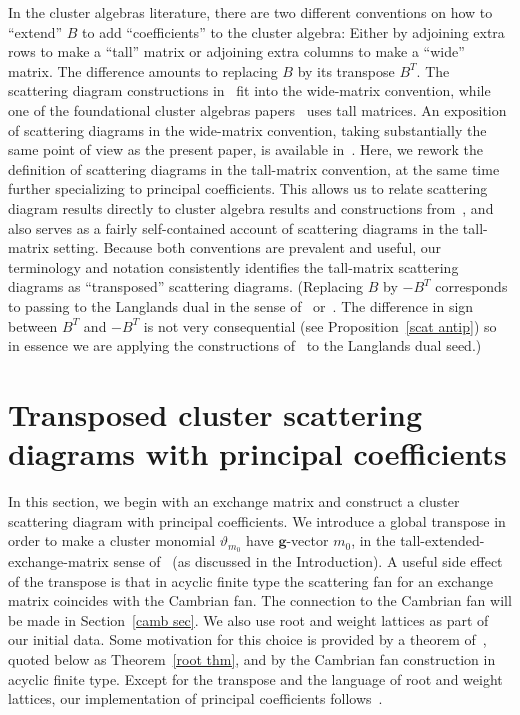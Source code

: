 \documentclass[ALCO,ThmDefs,Unicode,epreuves]{cedram}
\newcommand{\thet}{\vartheta}
\newcommand{\g}{\mathbf{g}}
\begin{document}
In the cluster algebras literature, there are two different conventions on how to ``extend'' $B$ to add ``coefficients'' to the cluster algebra: Either by adjoining extra rows to make a ``tall'' matrix or adjoining extra columns to make a ``wide'' matrix.
The difference amounts to replacing $B$ by its transpose $B^T$.
The scattering diagram constructions in~\cite{GHKK} fit into the wide-matrix convention, while one of the foundational cluster algebras papers~\cite{ca4} uses tall matrices.
An exposition of scattering diagrams in the wide-matrix convention, taking substantially the same point of view as the present paper, is available in~\cite{scatfan}.
Here, we rework the definition of scattering diagrams in the tall-matrix convention, at the same time further specializing to principal coefficients.
This allows us to relate scattering diagram results directly to cluster algebra results and constructions from~\cite{ca4}, and also serves as a fairly self-contained account of scattering diagrams in the tall-matrix setting.
Because both conventions are prevalent and useful, our terminology and notation consistently identifies the tall-matrix scattering diagrams as ``transposed'' scattering diagrams.
(Replacing $B$ by $-B^T$ corresponds to passing to the Langlands dual in the sense of~\cite[Section~1.2]{FG} or~\cite[Appendix~A]{GHKK}.
The difference in sign between $B^T$ and $-B^T$ is not very consequential (see Proposition~\ref{scat antip}) so in essence we are applying the constructions of~\cite{GHKK} to the Langlands dual seed.)





\section{Transposed cluster scattering diagrams with principal coefficients}\label{transp sec}
In this section, we begin with an exchange matrix and construct a cluster scattering diagram with principal coefficients.
We introduce a global transpose in order to make a cluster monomial $\thet_{m_0}$ have $\g$-vector $m_0$, in the tall-extended-exchange-matrix sense of~\cite{ca4} (as discussed in the Introduction).
A useful side effect of the transpose is that in acyclic finite type the scattering fan for an exchange matrix coincides with the Cambrian fan.
The connection to the Cambrian fan will be made in Section~\ref{camb sec}.
We also use root and weight lattices as part of our initial data.
Some motivation for this choice is provided by a theorem of~\cite{Bridgeland,GHKK}, quoted below as Theorem~\ref{root thm}, and by the Cambrian fan construction in acyclic finite type.
Except for the transpose and the language of root and weight lattices, our implementation of principal coefficients follows~\cite[Appendix~B]{GHKK}.
\end{document}
